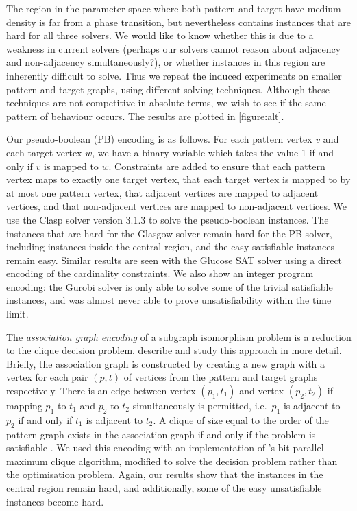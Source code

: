 \documentclass[twoside,11pt]{article}
\newcommand{\citet}[1]{\citeA{#1}}
\newcommand{\citep}[1]{\cite{#1}}
\begin{document}
The region in the parameter space where both pattern and target have medium density is far from a
phase transition, but nevertheless contains instances that are hard for all three solvers. We would
like to know whether this is due to a weakness in current solvers (perhaps our solvers cannot reason
about adjacency and non-adjacency simultaneously?), or whether instances in this region are
inherently difficult to solve.  Thus we repeat the induced experiments on smaller pattern and target
graphs, using different solving techniques.  Although these techniques are not competitive in
absolute terms, we wish to see if the same pattern of behaviour occurs. The results are plotted in
\cref{figure:alt}.

Our pseudo-boolean (PB) encoding is as follows. For each pattern vertex $v$ and each target vertex
$w$, we have a binary variable which takes the value 1 if and only if $v$ is mapped to $w$.
Constraints are added to ensure that each pattern vertex maps to exactly one target vertex, that
each target vertex is mapped to by at most one pattern vertex, that adjacent vertices are mapped to
adjacent vertices, and that non-adjacent vertices are mapped to non-adjacent vertices. We use the
Clasp solver \citep{DBLP:journals/aicom/GebserKKOSS11} version 3.1.3 to solve the pseudo-boolean instances.  The
instances that are hard for the Glasgow solver remain hard for the PB solver, including instances
inside the central region, and the easy satisfiable instances remain easy. Similar results are seen
with the Glucose SAT solver \citep{o:glucose} using a direct encoding of the cardinality constraints.
We also show an integer program encoding: the Gurobi solver is only able to solve some of the
trivial satisfiable instances, and was almost never able to prove unsatisfiability within the time
limit.

The \emph{association graph encoding} of a subgraph isomorphism problem is a reduction to the clique
decision problem. \citet{DBLP:conf/cp/McCreeshNPS16} describe and study this approach in more
detail. Briefly, the association graph is constructed by creating a new graph with a vertex for each
pair $(p, t)$ of vertices from the pattern and target graphs respectively. There is an edge between
vertex $(p_1, t_1)$ and vertex $(p_2, t_2)$ if mapping $p_1$ to $t_1$ and $p_2$ to $t_2$
simultaneously is permitted, i.e.\ $p_1$ is adjacent to $p_2$ if and only if $t_1$ is adjacent to
$t_2$. A clique of size equal to the order of the pattern graph exists in the association graph if
and only if the problem is satisfiable \citep{o:Levi73}. We used this encoding with an
implementation of \citet{DBLP:journals/cor/SegundoRJ11}'s bit-parallel maximum clique algorithm,
modified to solve the decision problem rather than the optimisation problem.  Again, our results
show that the instances in the central region remain hard, and additionally, some of the easy
unsatisfiable instances become hard.
\end{document}
